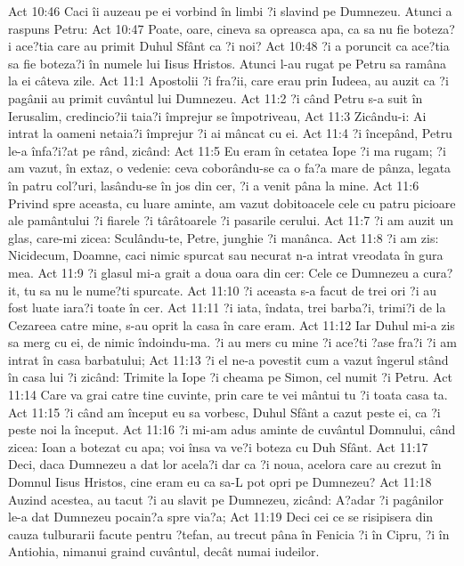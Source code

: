 Act 10:46  Caci îi auzeau pe ei vorbind în limbi ?i slavind pe Dumnezeu. Atunci a raspuns Petru:
Act 10:47  Poate, oare, cineva sa opreasca apa, ca sa nu fie boteza?i ace?tia care au primit Duhul Sfânt ca ?i noi?
Act 10:48  ?i a poruncit ca ace?tia sa fie boteza?i în numele lui Iisus Hristos. Atunci l-au rugat pe Petru sa ramâna la ei câteva zile.
Act 11:1  Apostolii ?i fra?ii, care erau prin Iudeea, au auzit ca ?i pagânii au primit cuvântul lui Dumnezeu.
Act 11:2  ?i când Petru s-a suit în Ierusalim, credincio?ii taia?i împrejur se împotriveau,
Act 11:3  Zicându-i: Ai intrat la oameni netaia?i împrejur ?i ai mâncat cu ei.
Act 11:4  ?i începând, Petru le-a înfa?i?at pe rând, zicând:
Act 11:5  Eu eram în cetatea Iope ?i ma rugam; ?i am vazut, în extaz, o vedenie: ceva coborându-se ca o fa?a mare de pânza, legata în patru col?uri, lasându-se în jos din cer, ?i a venit pâna la mine.
Act 11:6  Privind spre aceasta, cu luare aminte, am vazut dobitoacele cele cu patru picioare ale pamântului ?i fiarele ?i târâtoarele ?i pasarile cerului.
Act 11:7  ?i am auzit un glas, care-mi zicea: Sculându-te, Petre, junghie ?i manânca.
Act 11:8  ?i am zis: Nicidecum, Doamne, caci nimic spurcat sau necurat n-a intrat vreodata în gura mea.
Act 11:9  ?i glasul mi-a grait a doua oara din cer: Cele ce Dumnezeu a cura?it, tu sa nu le nume?ti spurcate.
Act 11:10  ?i aceasta s-a facut de trei ori ?i au fost luate iara?i toate în cer.
Act 11:11  ?i iata, îndata, trei barba?i, trimi?i de la Cezareea catre mine, s-au oprit la casa în care eram.
Act 11:12  Iar Duhul mi-a zis sa merg cu ei, de nimic îndoindu-ma. ?i au mers cu mine ?i ace?ti ?ase fra?i ?i am intrat în casa barbatului;
Act 11:13  ?i el ne-a povestit cum a vazut îngerul stând în casa lui ?i zicând: Trimite la Iope ?i cheama pe Simon, cel numit ?i Petru.
Act 11:14  Care va grai catre tine cuvinte, prin care te vei mântui tu ?i toata casa ta.
Act 11:15  ?i când am început eu sa vorbesc, Duhul Sfânt a cazut peste ei, ca ?i peste noi la început.
Act 11:16  ?i mi-am adus aminte de cuvântul Domnului, când zicea: Ioan a botezat cu apa; voi însa va ve?i boteza cu Duh Sfânt.
Act 11:17  Deci, daca Dumnezeu a dat lor acela?i dar ca ?i noua, acelora care au crezut în Domnul Iisus Hristos, cine eram eu ca sa-L pot opri pe Dumnezeu?
Act 11:18  Auzind acestea, au tacut ?i au slavit pe Dumnezeu, zicând: A?adar ?i pagânilor le-a dat Dumnezeu pocain?a spre via?a;
Act 11:19  Deci cei ce se risipisera din cauza tulburarii facute pentru ?tefan, au trecut pâna în Fenicia ?i în Cipru, ?i în Antiohia, nimanui graind cuvântul, decât numai iudeilor.
